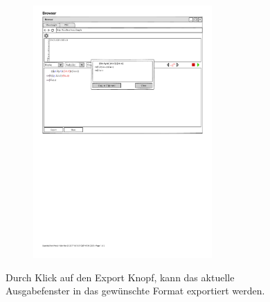 \documentclass[parskip=full,11pt,twoside]{scrartcl}
\begin{document}
\begin{figure}[H]
\begin{subfigure}{0.75\textwidth}
		\includegraphics[width=0.75\textwidth]{img/wavelength_export_window_unicode}
	\end{subfigure}
	\caption{Durch Klick auf den Export Knopf, kann das aktuelle Ausgabefenster in das gewünschte Format exportiert werden.}
\end{figure}
\end{document}
